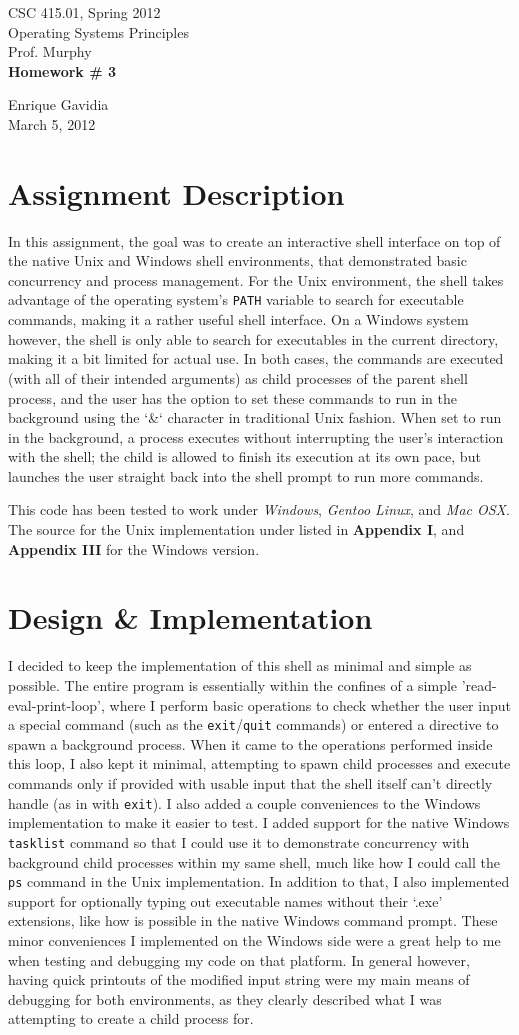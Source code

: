 \documentclass[12pt]{article}
\def \name       {Enrique Gavidia}
\def \coursenum  {CSC 415.01}
\def \coursename {Operating Systems Principles}
\def \instructor {Prof. Murphy}
\def \semester   {Spring 2012}
\def \assignment {Homework \# 3}
\def \duedate    {March 5, 2012}
\newcommand {\makecover} {
  \begin{titlepage}
    \begin{center}
     
      \LARGE{\coursenum, \semester \\ \coursename}\\
      \Large{\instructor}\\
     
      \vfill
      \textbf{\Huge \assignment}\\
      \vfill
      
      \Large{\name}\\ 
      \large{\duedate}
      
    \end{center}
  \end{titlepage}
}
\begin{document}
\makecover

\section*{Assignment Description}
In this assignment, the goal was to create an interactive shell interface on top of the native Unix and Windows shell environments, that
demonstrated basic concurrency and process management. For the Unix environment, the shell takes advantage of the operating system's 
\texttt{PATH} variable to search for executable commands, making it a rather useful shell interface. On a Windows system however, the shell 
is only able to search for executables in the current directory, making it a bit limited for actual use. In both cases, the commands are 
executed (with all of their intended arguments) as child processes of the parent shell process, and the user has the option to set these commands 
to run in the background using the `\&` character in traditional Unix fashion. When set to run in the background, a process executes without 
interrupting the user's interaction with the shell; the child is allowed to finish its execution at its own pace, but launches the user straight 
back into the shell prompt to run more commands. 

This code has been tested to work under \textsl{Windows}, \textsl{Gentoo Linux}, and \textsl{Mac OSX}. 
The source for the Unix implementation under listed in \textbf{Appendix I}, and \textbf{Appendix III} for the Windows version.

\section*{Design \& Implementation}
I decided to keep the implementation of this shell as minimal and simple as possible. The entire program is essentially within the
confines of a simple 'read-eval-print-loop', where I perform basic operations to check whether the user input a special command (such as the
\texttt{exit}/\texttt{quit} commands) or entered a directive to spawn a background process. When it came to the operations performed inside 
this loop, I also kept it minimal, attempting to spawn child processes and execute commands only if provided with usable input that the shell itself 
can't directly handle (as in with \texttt{exit}). I also added a couple conveniences to the Windows implementation to make it easier to test. I added 
support for the native Windows \texttt{tasklist} command so that I could use it to demonstrate concurrency with background child processes within my 
same shell, much like how I could call the \texttt{ps} command in the Unix implementation. In addition to that, I also implemented support for optionally 
typing out executable names without their `.exe' extensions, like how is possible in the native Windows command prompt.
These minor conveniences I implemented on the Windows side were a great help to me when testing and debugging my code on that platform. In general however,
having quick printouts of the modified input string were my main means of debugging for both environments, as they clearly described what I was attempting
to create a child process for. 
\end{document}
